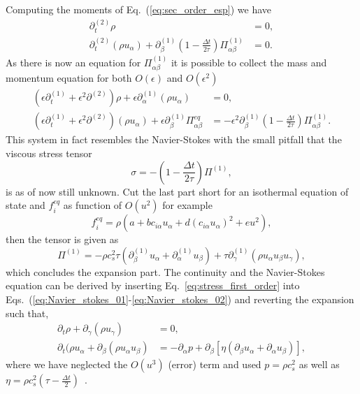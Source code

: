 Computing the moments of Eq.~(\ref{eq:sec_order_esp}) we have
\begin{align}
    \partial_t^{(2)}\rho &= 0, \\
    \partial_t^{(2)}(\rho u_{\alpha}) + \partial^{(1)}_{\beta}\left(1 - \frac{\Delta t}{2\tau}\right)\Pi_{\alpha\beta}^{(1)} &= 0.
\end{align}
As there is now an equation for $\Pi^{(1)}_{\alpha\beta}$ it is possible to collect the mass and momentum equation for both $O(\epsilon)$ and $O(\epsilon^2)$
\begin{align}
    (\epsilon\partial_t^{(1)} + \epsilon^2\partial^{(2)})\rho + \epsilon\partial_{\alpha}^{(1)}(\rho u_{\alpha}) &= 0, \label{eq:Navier_stokes_01}\\
    (\epsilon\partial_t^{(1)} + \epsilon^2\partial^{(2)})(\rho u_{\alpha}) + \epsilon\partial_{\beta}^{(1)}\Pi^{eq}_{\alpha\beta} &= -\epsilon^2\partial_{\beta}^{(1)}\left(1 - \frac{\Delta t}{2\tau}\right) \Pi^{(1)}_{\alpha\beta}. \label{eq:Navier_stokes_02}
\end{align}
This system in fact resembles the Navier-Stokes with the small pitfall that the viscous stress tensor
\begin{equation}
    \sigma = - \left(1 - \frac{\Delta t}{2\tau}\right) \Pi^{(1)},
\end{equation}
is as of now still unknown.
Cut the last part short for an isothermal equation of state and $f_{i}^{eq}$ as function of $O(u^2)$ for example
\begin{equation}\label{eq:eqi_dist1}
    f_{i}^{eq} = \rho(a + b c_{i\alpha} u_{\alpha} + d (c_{i\alpha} u_{\alpha})^2 + e u^2),
\end{equation}
then the tensor is given as
\begin{equation}\label{eq:stress_first_order}
    \Pi^{(1)} = -\rho c_s^2\tau(\partial_{\beta}^{(1)}u_{\alpha} + \partial_{\alpha}^{(1)}u_{\beta}) + \tau\partial_{\gamma}^{(1)}(\rho u_{\alpha} u_{\beta} u_{\gamma}),
\end{equation}
which concludes the expansion part.
The continuity and the Navier-Stokes equation can be derived by inserting Eq.~{\ref{eq:stress_first_order}} into Eqs.~(\ref{eq:Navier_stokes_01}-\ref{eq:Navier_stokes_02}) and reverting the expansion such that,
\begin{align}
    \partial_t\rho + \partial_{\gamma}(\rho u_{\gamma}) &= 0, \\
    \partial_t(\rho u_{\alpha} + \partial_{\beta}(\rho u_{\alpha}u_{\beta}) &= -\partial_{\alpha}p + \partial_{\beta}[\eta(\partial_{\beta}u_{\alpha} +\partial_{\alpha}u_{\beta})],
\end{align}
where we have neglected the $O(u^3)$ (error) term and used $p = \rho c_s^{2}$ as well as $\eta = \rho c_s^{2}\left(\tau - \frac{\Delta t}{2}\right)$~\cite{krugerLatticeBoltzmannMethod2017}.


